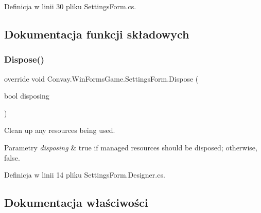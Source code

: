 Definicja w linii 30 pliku Settings\+Form.\+cs.



\subsection{Dokumentacja funkcji składowych}
\hypertarget{class_convay_1_1_win_forms_game_1_1_settings_form_a5d7c42e4caba886b6485ae8666b563a8}{}\label{class_convay_1_1_win_forms_game_1_1_settings_form_a5d7c42e4caba886b6485ae8666b563a8} 
\subsubsection{\texorpdfstring{Dispose()}{Dispose()}}
{\footnotesize\ttfamily override void Convay.\+Win\+Forms\+Game.\+Settings\+Form.\+Dispose (\begin{DoxyParamCaption}\item[{bool}]{disposing }\end{DoxyParamCaption})\hspace{0.3cm}{\ttfamily [protected]}}



Clean up any resources being used. 


\begin{DoxyParams}{Parametry}
{\em disposing} & true if managed resources should be disposed; otherwise, false.\\
\hline
\end{DoxyParams}


Definicja w linii 14 pliku Settings\+Form.\+Designer.\+cs.



\subsection{Dokumentacja właściwości}
\hypertarget{class_convay_1_1_win_forms_game_1_1_settings_form_a5c69453b0b77e84e7bf2728623404968}{}\label{class_convay_1_1_win_forms_game_1_1_settings_form_a5c69453b0b77e84e7bf2728623404968} 
